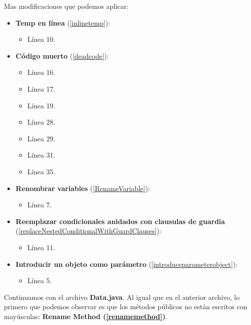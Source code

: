 \documentclass[11pt,a4paper,oneside]{book}
\begin{document}
\newline
Mas modificaciones que podemos aplicar:

\begin{itemize}
    \item \textbf{Temp en línea} (\ref{inlinetemp}):
    \begin{itemize}
        \item Línea 10.
    \end{itemize}
    
    \item \textbf{Código muerto} (\ref{deadcode}):
    \begin{itemize}
        \item Línea 16.
        \item Línea 17.
        \item Línea 19.
        \item Línea 28.
        \item Línea 29.
        \item Línea 31.
        \item Línea 35.
    \end{itemize}
    
    \item \textbf{Renombrar variables} (\ref{RenameVariable}):
    \begin{itemize}
        \item Línea 7.
    \end{itemize}
    
    \item \textbf{Reemplazar condicionales anidados con clausulas de guardia} (\ref{replaceNestedConditionalWithGuardClauses}):
    \begin{itemize}
        \item Línea 11.
    \end{itemize}
    
    \item \textbf{Introducir un objeto como parámetro} (\ref{introduceparameterobject}):
    \begin{itemize}
        \item Línea 5.
    \end{itemize}
\end{itemize}

Continuamos con el archivo \textbf{Data.java}. Al igual que en el anterior archivo, lo primero que podemos observar es que los métodos públicos no están escritos con mayúsculas: \textbf{Rename Method (\ref{renamemethod})}.
\end{document}
